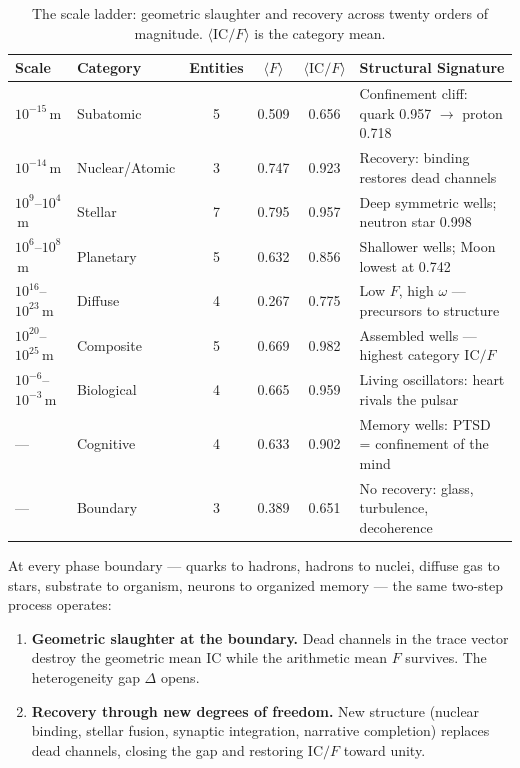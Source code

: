 \documentclass[
  aps,
  prd,
  twocolumn,
  superscriptaddress,
  nofootinbib,
  floatfix
]{revtex4-2}
\newcommand{\IC}{\mathrm{IC}}
\begin{document}
\clearpage
\begin{table}[t]
\caption{\label{tab:ladder}The scale ladder: geometric
slaughter and recovery across twenty orders of magnitude.
$\langle \IC/F \rangle$ is the category mean.}
\begin{ruledtabular}
\begin{tabular}{llcccl}
Scale & Category & Entities & $\langle F \rangle$ &
  $\langle \IC/F \rangle$ & Structural Signature \\
\hline
$10^{-15}$\,m & Subatomic &
  5 & 0.509 & 0.656 &
  Confinement cliff: quark 0.957 $\to$ proton 0.718 \\
$10^{-14}$\,m & Nuclear/Atomic &
  3 & 0.747 & 0.923 &
  Recovery: binding restores dead channels \\
$10^{9}$--$10^{4}$\,m & Stellar &
  7 & 0.795 & 0.957 &
  Deep symmetric wells; neutron star 0.998 \\
$10^{6}$--$10^{8}$\,m & Planetary &
  5 & 0.632 & 0.856 &
  Shallower wells; Moon lowest at 0.742 \\
$10^{16}$--$10^{23}$\,m & Diffuse &
  4 & 0.267 & 0.775 &
  Low $F$, high $\omega$ --- precursors to structure \\
$10^{20}$--$10^{25}$\,m & Composite &
  5 & 0.669 & 0.982 &
  Assembled wells --- highest category $\IC/F$ \\
$10^{-6}$--$10^{-3}$\,m & Biological &
  4 & 0.665 & 0.959 &
  Living oscillators: heart rivals the pulsar \\
--- & Cognitive &
  4 & 0.633 & 0.902 &
  Memory wells: PTSD = confinement of the mind \\
--- & Boundary &
  3 & 0.389 & 0.651 &
  No recovery: glass, turbulence, decoherence \\
\end{tabular}
\end{ruledtabular}
\end{table}

At every phase boundary --- quarks to hadrons, hadrons to
nuclei, diffuse gas to stars, substrate to organism, neurons
to organized memory --- the same two-step process operates:

\begin{enumerate}
\item \textbf{Geometric slaughter at the boundary.}
  Dead channels in the trace vector destroy the geometric
  mean $\IC$ while the arithmetic mean $F$ survives.  The
  heterogeneity gap $\Delta$ opens.
\item \textbf{Recovery through new degrees of freedom.}
  New structure (nuclear binding, stellar fusion, synaptic
  integration, narrative completion) replaces dead channels,
  closing the gap and restoring $\IC/F$ toward unity.
\end{enumerate}
\end{document}

